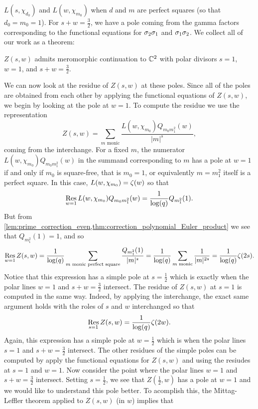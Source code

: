 \documentclass[12pt,reqno,oneside]{amsart}
\begin{document}
$L(s,\chi_{d_{0}})$ and $L(w,\chi_{m_{0}})$ when $d$ and $m$ are perfect squares (so that $d_{0} = m_{0} = 1$). For $s+w = \frac{3}{2}$, we have a pole coming from the gamma factors corresponding to the functional equations for $\sigma_{2}\sigma_{1}$ and $\sigma_{1}\sigma_{2}$. We collect all of our work as a theorem:

    \begin{theorem}
        $Z(s,w)$ admits meromorphic continuation to $\mathbb{C}^{2}$ with polar divisors $s = 1$, $w = 1$, and $s+w = \frac{3}{2}$.
    \end{theorem}

    We can now look at the residue of $Z(s,w)$ at these poles. Since all of the poles are obtained from each other by applying the functional equations of $Z(s,w)$, we begin by looking at the pole at $w = 1$. To compute the residue we use the representation
    \[
        Z(s,w) = \sum_{\text{$m$ monic}}\frac{L(w,\chi_{m_{0}})Q_{m_{0}m_{1}^{2}}(w)}{|m|^{s}},
    \]
    coming from the interchange. For a fixed $m$, the numerator $L(w,\chi_{m_{0}})Q_{m_{0}m_{1}^{2}}(w)$ in the summand corresponding to $m$ has a pole at $w = 1$ if and only if $m_{0}$ is square-free, that is $m_{0} = 1$, or equivalently $m = m_{1}^{2}$ itself is a perfect square. In this case, $L(w,\chi_{m_{0}}) = \zeta(w)$ so that
    \[
        \operatorname*{\mathrm{Res}}_{w = 1}L(w,\chi_{m_{0}})Q_{m_{0}m_{1}^{2}}(w) = \frac{1}{\log(q)}Q_{m_{1}^{2}}(1).
    \]
    But from \cref{lem:prime_correction_even,thm:correction_polynomial_Euler_product} we see that $Q_{m_{1}^{2}}(1) = 1$, and so
    \[
        \operatorname*{\mathrm{Res}}_{w = 1}Z(s,w) = \frac{1}{\log(q)}\sum_{\text{$m$ monic perfect square}}\frac{Q_{m_{1}^{2}}(1)}{|m|^{s}} = \frac{1}{\log(q)}\sum_{\text{$m$ monic}}\frac{1}{|m|^{2s}} = \frac{1}{\log(q)}\zeta(2s).
    \]
    Notice that this expression has a simple pole at $s = \frac{1}{2}$ which is exactly when the polar lines $w = 1$ and $s+w = \frac{3}{2}$ intersect. The residue of $Z(s,w)$ at $s = 1$ is computed in the same way. Indeed, by applying the interchange, the exact same argument holds with the roles of $s$ and $w$ interchanged so that
    \[
        \operatorname*{\mathrm{Res}}_{s = 1}Z(s,w) = \frac{1}{\log(q)}\zeta(2w).
    \]
    Again, this expression has a simple pole at $w = \frac{1}{2}$ which is when the polar lines $s = 1$ and $s+w = \frac{3}{2}$ intersect. The other residues of the simple poles can be computed by apply the functional equations for $Z(s,w)$ and using the resiudes at $s = 1$ and $w = 1$. Now consider the point where the polar lines $w = 1$ and $s+w = \frac{3}{2}$ intersect. Setting $s = \frac{1}{2}$, we see that $Z\left(\frac{1}{2},w\right)$ has a pole at $w= 1$ and we would like to understand this pole better. To acomplish this, the Mittag-Leffler theorem applied to $Z(s,w)$ (in $w$) implies that
\end{document}
